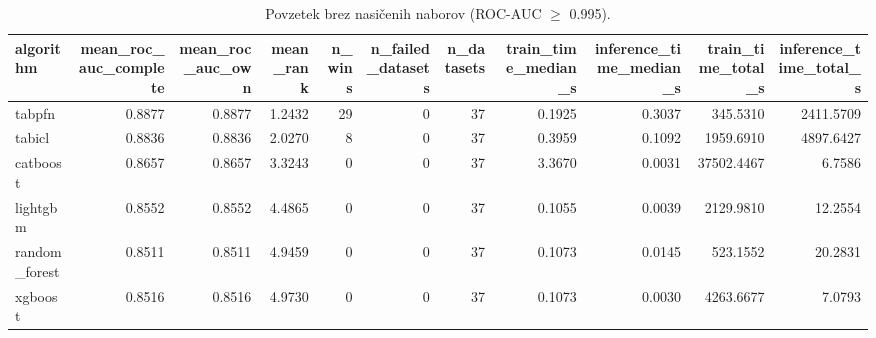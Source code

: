 \begin{table}[htbp]
\centering
\caption{Povzetek brez nasičenih naborov (ROC-AUC $\geq$ 0.995).}
\label{tab:overall-nonsat}
\begin{tabular}{lrrrrrrrrrr}
\hline
algorithm & mean\_roc\_auc\_complete & mean\_roc\_auc\_own & mean\_rank & n\_wins & n\_failed\_datasets & n\_datasets & train\_time\_median\_s & inference\_time\_median\_s & train\_time\_total\_s & inference\_time\_total\_s \\
\hline
tabpfn & 0.8877 & 0.8877 & 1.2432 & 29 & 0 & 37 & 0.1925 & 0.3037 & 345.5310 & 2411.5709 \\
tabicl & 0.8836 & 0.8836 & 2.0270 & 8 & 0 & 37 & 0.3959 & 0.1092 & 1959.6910 & 4897.6427 \\
catboost & 0.8657 & 0.8657 & 3.3243 & 0 & 0 & 37 & 3.3670 & 0.0031 & 37502.4467 & 6.7586 \\
lightgbm & 0.8552 & 0.8552 & 4.4865 & 0 & 0 & 37 & 0.1055 & 0.0039 & 2129.9810 & 12.2554 \\
random\_forest & 0.8511 & 0.8511 & 4.9459 & 0 & 0 & 37 & 0.1073 & 0.0145 & 523.1552 & 20.2831 \\
xgboost & 0.8516 & 0.8516 & 4.9730 & 0 & 0 & 37 & 0.1073 & 0.0030 & 4263.6677 & 7.0793 \\
\hline
\end{tabular}
\end{table}
